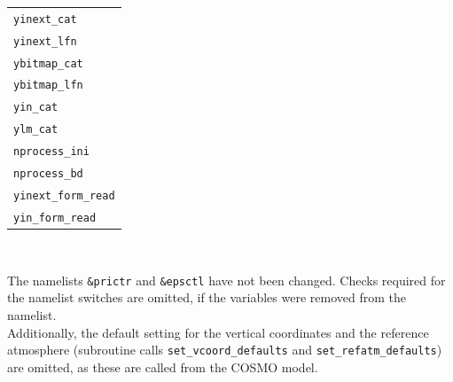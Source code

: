 \documentclass[11pt,twoside]{article}
\begin{document}
\begin{center}
{\begin{tabular}{|l|}
\tt  yinext\_cat\\
\tt  yinext\_lfn\\
\tt  ybitmap\_cat\\
\tt  ybitmap\_lfn \\
\tt  yin\_cat \\
\tt  ylm\_cat \\
\tt  nprocess\_ini \\
\tt  nprocess\_bd \\
\tt  yinext\_form\_read\\
\tt  yin\_form\_read\\ \hline
\end{tabular}\\[1.cm]
}
\end{center}

 The namelists \verb|&prictr| and \verb|&epsctl| have not been changed.
Checks required for the namelist switches are omitted, if the variables were 
removed from the namelist. \\
Additionally, the default setting for the vertical coordinates and the
reference atmosphere (subroutine calls \verb|set_vcoord_defaults| and
\verb|set_refatm_defaults|) are omitted, as these are called from the
COSMO model.
\end{document}
